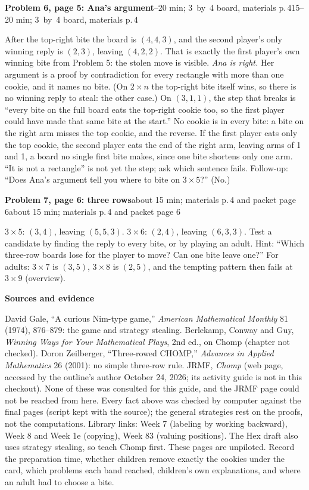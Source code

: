 \documentclass[11pt]{article}
\newcommand{\head}[1]{\par\textbf{\large #1}\par}
\newcommand{\sub}[2][]{\par\textbf{#2}\ifx\relax#1\relax\else\hfill{\small #1}\fi\par}
\newcommand{\mat}[1]{materials p.\,#1}
\newcommand{\pos}[1]{$(#1)$}
\begin{document}
\sub[15--20 min; 3~by~4 board, \mat{4}]{Problem 6, page 5: Ana's argument}
After the top-right bite the board is \pos{4,4,3}, and the second player's only winning reply is $(2,3)$, leaving \pos{4,2,2}. That is exactly the first player's own winning bite from Problem 5: the stolen move is visible. \emph{Ana is right.} Her argument is a proof by contradiction for every rectangle with more than one cookie, and it names no bite. (On $2\times n$ the top-right bite itself wins, so there is no winning reply to steal: the other case.) On \pos{3,1,1}, the step that breaks is ``every bite on the full board eats the top-right cookie too, so the first player could have made that same bite at the start.'' No cookie is in every bite: a bite on the right arm misses the top cookie, and the reverse. If the first player eats only the top cookie, the second player eats the end of the right arm, leaving arms of 1 and 1, a board no single first bite makes, since one bite shortens only one arm. ``It is not a rectangle'' is not yet the step; ask which sentence fails. Follow-up: ``Does Ana's argument tell you where to bite on $3\times5$?'' (No.)

\sub[about 15 min; \mat{4} and packet page 6]{Problem 7, page 6: three rows}
$3\times5$: $(3,4)$, leaving \pos{5,5,3}. $3\times6$: $(2,4)$, leaving \pos{6,3,3}. Test a candidate by finding the reply to every bite, or by playing an adult. Hint: ``Which three-row boards lose for the player to move? Can one bite leave one?'' For adults: $3\times7$ is $(3,5)$, $3\times8$ is $(2,5)$, and the tempting pattern then fails at $3\times9$ (overview).

\head{Sources and evidence}
{\small David Gale, ``A curious Nim-type game,'' \emph{American Mathematical Monthly} 81 (1974), 876--879: the game and strategy stealing. Berlekamp, Conway and Guy, \emph{Winning Ways for Your Mathematical Plays}, 2nd ed., on Chomp (chapter not checked). Doron Zeilberger, ``Three-rowed CHOMP,'' \emph{Advances in Applied Mathematics} 26 (2001): no simple three-row rule. JRMF, \emph{Chomp} (web page, accessed by the outline's author October 24, 2026; its activity guide is not in this checkout). None of these was consulted for this guide, and the JRMF page could not be reached from here. Every fact above was checked by computer against the final pages (script kept with the source); the general strategies rest on the proofs, not the computations. Library links: Week 7 (labeling by working backward), Week 8 and Week 1e (copying), Week 83 (valuing positions). The Hex draft also uses strategy stealing, so teach Chomp first. These pages are unpiloted. Record the preparation time, whether children remove exactly the cookies under the card, which problems each band reached, children's own explanations, and where an adult had to choose a bite.\par}
\end{document}
